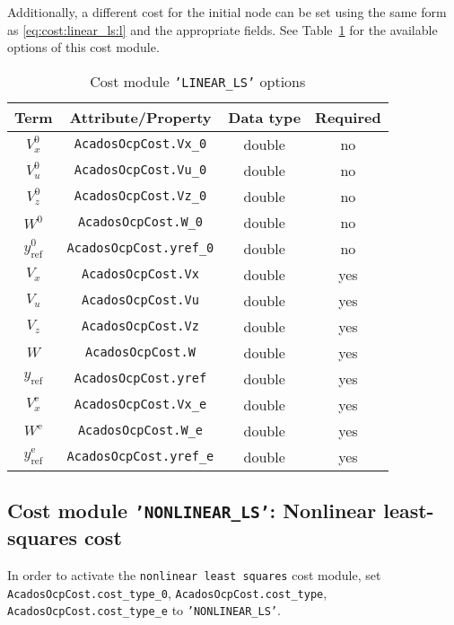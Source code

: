 \documentclass[english]{article}
\newcommand{\code}[1]{\texttt{#1}}
\newcommand{\ind}[1]{_{\textrm{#1}}}
\newcommand{\terminal}{^{\textrm{e}}}
\newcommand{\initial}{^{\textrm{0}}}
\newcommand{\mandatory}{yes}
\newcommand{\optional}{no}
\begin{document}
Additionally, a different cost for the initial node can be set using the same form as \eqref{eq:cost:linear_ls:l} and the appropriate fields.
See Table~\ref{tab:cost:linear_ls} for the available options of this cost module.
%
\begin{table}[ht!]
    \centering
    \begin{tabular}{cccc}
        \toprule
        Term & Attribute/Property & Data type & Required \\ \midrule
        $ V_x\initial $ & \code{AcadosOcpCost.Vx\_0}    & double & \optional   \\
        $ V_u\initial $ & \code{AcadosOcpCost.Vu\_0}    & double & \optional   \\
        $ V_z\initial $ & \code{AcadosOcpCost.Vz\_0}    & double & \optional  \\
        $ W\initial $ & \code{AcadosOcpCost.W\_0}    & double & \optional  \\
        $ y\ind{ref}\initial $ & \code{AcadosOcpCost.yref\_0}    & double & \optional   \\ [1em]
        $ V_x $ & \code{AcadosOcpCost.Vx}    & double & \mandatory   \\
        $ V_u $ & \code{AcadosOcpCost.Vu}    & double & \mandatory   \\
        $ V_z $ & \code{AcadosOcpCost.Vz}    & double & \mandatory  \\
        $ W $ & \code{AcadosOcpCost.W}    & double & \mandatory  \\
        $ y\ind{ref} $ & \code{AcadosOcpCost.yref}    & double & \mandatory   \\ [1em]
        $ V_x\terminal $ & \code{AcadosOcpCost.Vx\_e}    & double  & \mandatory  \\
        $ W\terminal $ & \code{AcadosOcpCost.W\_e}    & double & \mandatory   \\
        $ y\ind{ref}\terminal $ & \code{AcadosOcpCost.yref\_e}   & double & \mandatory   \\
        \bottomrule
    \end{tabular}
\caption{Cost module \code{'LINEAR\_LS'} options} \label{tab:cost:linear_ls}
\end{table}
%
\subsection{Cost module \code{'NONLINEAR\_LS'}: Nonlinear least-squares cost}\label{sec:cost:nonlinear_ls}
%
In order to activate the \code{nonlinear least squares} cost module, set \code{AcadosOcpCost.cost\_type\_0}, \code{AcadosOcpCost.cost\_type}, \code{AcadosOcpCost.cost\_type\_e} to \code{'NONLINEAR\_LS'}.
\end{document}
